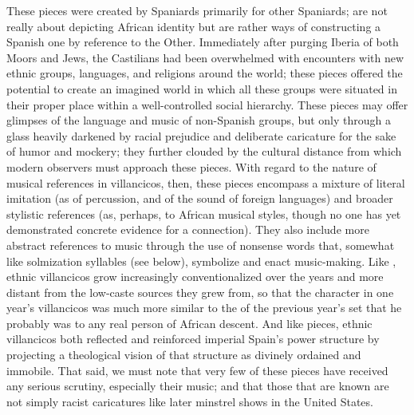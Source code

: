 These pieces were created by Spaniards primarily for other Spaniards;
 are not really about depicting African identity but
are rather ways of constructing a Spanish one by reference to the Other.
Immediately after purging Iberia of both Moors and Jews, the Castilians had
been overwhelmed with encounters with new ethnic groups, languages, and
religions around the world; these pieces offered the potential to create an
imagined world in which all these groups were situated in their proper place
within a well-controlled social hierarchy.
These pieces may offer glimpses of the language and music of non-Spanish
groups, but only through a glass heavily darkened by racial prejudice and
deliberate caricature for the sake of humor and mockery; they further clouded
by the cultural distance from which modern observers must approach these
pieces.
With regard to the nature of musical references in 
villancicos, then, these pieces encompass a mixture of literal imitation (as of
percussion, and of the  sound of foreign languages) and
broader stylistic references (as, perhaps, to African musical styles, though no
one has yet demonstrated concrete evidence for a connection).
They also include more abstract references to music through the use of nonsense
words that, somewhat like solmization syllables (see below), symbolize and
enact music-making.
Like , ethnic villancicos grow increasingly conventionalized over
the years and more distant from the low-caste sources they grew from, so that
the  character in one year's villancicos was much more similar to
the  of the previous year's set that he probably was to any real
person of African descent.
And like  pieces, ethnic villancicos both reflected and reinforced
imperial Spain's power structure by projecting a theological vision of that
structure as divinely ordained and immobile.
That said, we must note that very few of these pieces have received any serious
scrutiny, especially their music; and that those that are known are not simply
racist caricatures like later minstrel shows in the United States.

